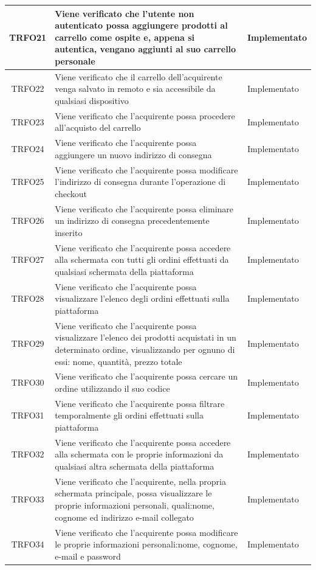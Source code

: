 \begin{longtable}{|c| C{10cm} |C{3cm}|}
	TRFO21 & Viene verificato che l'utente non autenticato possa aggiungere prodotti al carrello come ospite e, appena si autentica, vengano aggiunti al suo carrello personale & Implementato\\ \hline
	TRFO22 & Viene verificato che il carrello dell'acquirente venga salvato in remoto e sia accessibile da qualsiasi dispositivo & Implementato\\ \hline
   	TRFO23 & Viene verificato che l'acquirente possa procedere all'acquisto del carrello & Implementato\\ \hline
   	TRFO24 & Viene verificato che l'acquirente possa aggiungere un nuovo indirizzo di consegna & Implementato\\ \hline
   	TRFO25 & Viene verificato che l'acquirente possa modificare l'indirizzo di consegna durante l'operazione di checkout & Implementato\\ \hline
	TRFO26 & Viene verificato che l'acquirente possa eliminare un indirizzo di consegna precedentemente inserito & Implementato\\ \hline
	TRFO27 & Viene verificato che l'acquirente possa accedere alla schermata con tutti gli ordini effettuati da qualsiasi schermata della piattaforma & Implementato \\ \hline
	TRFO28 & Viene verificato che l'acquirente possa visualizzare l'elenco degli ordini effettuati sulla piattaforma & Implementato\\ \hline
	TRFO29 & Viene verificato che l'acquirente possa visualizzare l'elenco dei prodotti acquistati in un determinato ordine, visualizzando per ognuno di essi: nome, quantità, prezzo totale & Implementato\\ \hline
	TRFO30 & Viene verificato che l'acquirente possa cercare un ordine utilizzando il suo codice & Implementato\\ \hline
	TRFO31 & Viene verificato che l'acquirente possa filtrare temporalmente gli ordini effettuati sulla piattaforma & Implementato\\ \hline
	TRFO32 & Viene verificato che l'acquirente possa accedere alla schermata con le proprie informazioni da qualsiasi altra schermata della piattaforma & Implementato\\ \hline
	TRFO33 & Viene verificato che l'acquirente, nella propria schermata principale, possa visualizzare le proprie informazioni personali, quali:nome, cognome ed indirizzo e-mail collegato & Implementato\\ \hline
	TRFO34 & Viene verificato che l'acquirente possa modificare le proprie informazioni personali:nome, cognome, e-mail e password & Implementato\\ \hline

\end{longtable}
